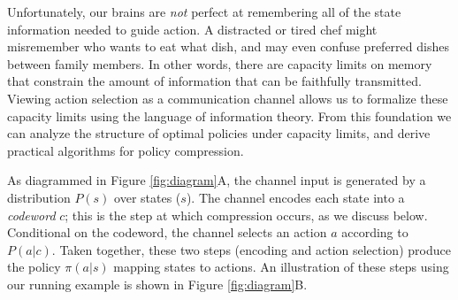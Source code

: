 \documentclass[11pt]{article}
\begin{document}
Unfortunately, our brains are \textit{not} perfect at remembering all of the state information needed to guide action. A distracted or tired chef might misremember who wants to eat what dish, and may even confuse preferred dishes between family members. In other words, there are capacity limits on memory that constrain the amount of information that can be faithfully transmitted. Viewing action selection as a communication channel allows us to formalize these capacity limits using the language of information theory. From this foundation we can analyze the structure of optimal policies under capacity limits, and derive practical algorithms for policy compression.

As diagrammed in Figure \ref{fig:diagram}A, the channel input is generated by a distribution $P(s)$ over states ($s$). The channel encodes each state into a \emph{codeword} $c$; this is the step at which compression occurs, as we discuss below. Conditional on the codeword, the channel selects an action $a$ according to $P(a|c)$. Taken together, these two steps (encoding and action selection) produce the policy $\pi(a|s)$ mapping states to actions. An illustration of these steps using our running example is shown in Figure \ref{fig:diagram}B.
\end{document}
